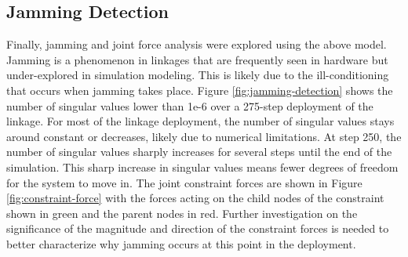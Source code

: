 \subsection{Jamming Detection}
Finally, jamming and joint force analysis were explored using the above model. Jamming is a phenomenon in linkages that are frequently seen in hardware but under-explored in simulation modeling. This is likely due to the ill-conditioning that occurs when jamming takes place. Figure \ref{fig:jamming-detection} shows the number of singular values lower than 1e-6 over a 275-step deployment of the linkage. For most of the linkage deployment, the number of singular values stays around constant or decreases, likely due to numerical limitations. At step 250, the number of singular values sharply increases for several steps until the end of the simulation. This sharp increase in singular values means fewer degrees of freedom for the system to move in. The joint constraint forces are shown in Figure \ref{fig:constraint-force} with the forces acting on the child nodes of the constraint shown in green and the parent nodes in red. Further investigation on the significance of the magnitude and direction of the constraint forces is needed to better characterize why jamming occurs at this point in the deployment. 







